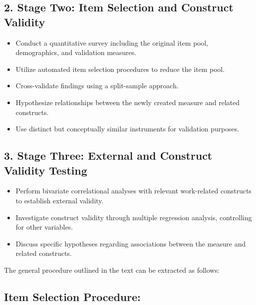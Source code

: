 \documentclass[
  12pt,
  a4paper,
  twoside]{article}
\providecommand{\tightlist}{%
  \setlength{\itemsep}{0pt}\setlength{\parskip}{0pt}}
\begin{document}
\hypertarget{stage-two-item-selection-and-construct-validity}{%
\subsection{2. Stage Two: Item Selection and Construct Validity}\label{stage-two-item-selection-and-construct-validity}}

\begin{itemize}
\tightlist
\item
  Conduct a quantitative survey including the original item pool, demographics, and validation measures.
\item
  Utilize automated item selection procedures to reduce the item pool.
\item
  Cross-validate findings using a split-sample approach.
\item
  Hypothesize relationships between the newly created measure and related constructs.
\item
  Use distinct but conceptually similar instruments for validation purposes.
\end{itemize}

\hypertarget{stage-three-external-and-construct-validity-testing}{%
\subsection{3. Stage Three: External and Construct Validity Testing}\label{stage-three-external-and-construct-validity-testing}}

\begin{itemize}
\tightlist
\item
  Perform bivariate correlational analyses with relevant work-related constructs to establish external validity.
\item
  Investigate construct validity through multiple regression analysis, controlling for other variables.
\item
  Discuss specific hypotheses regarding associations between the measure and related constructs.
\end{itemize}

The general procedure outlined in the text can be extracted as follows:

\hypertarget{item-selection-procedure}{%
\subsection{Item Selection Procedure:}\label{item-selection-procedure}}
\end{document}
